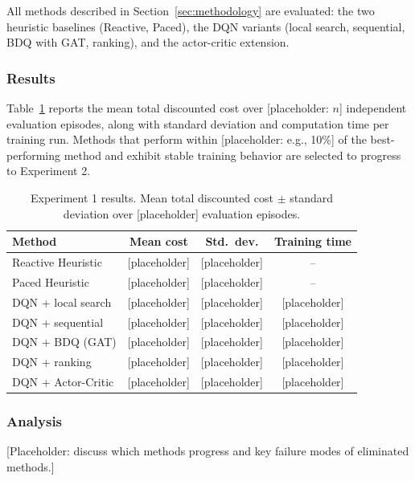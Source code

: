 \documentclass[3p, twocolumn]{elsarticle}
\begin{document}
All methods described in Section~\ref{sec:methodology} are evaluated: the two heuristic baselines (Reactive, Paced), the DQN variants (local search, sequential, BDQ with GAT, ranking), and the actor-critic extension.

\subsubsection{Results}

Table~\ref{tab:exp1_results} reports the mean total discounted cost over [placeholder: $n$] independent evaluation episodes, along with standard deviation and computation time per training run. Methods that perform within [placeholder: e.g., 10\%] of the best-performing method and exhibit stable training behavior are selected to progress to Experiment 2.

\begin{table}[htpb]
\centering
\caption{Experiment 1 results. Mean total discounted cost $\pm$ standard deviation over [placeholder] evaluation episodes.}
\label{tab:exp1_results}
\small
\begin{tabular}{lccc}
\hline
\textbf{Method} & \textbf{Mean cost} & \textbf{Std.\ dev.} & \textbf{Training time} \\
\hline
Reactive Heuristic      & [placeholder] & [placeholder] & -- \\
Paced Heuristic         & [placeholder] & [placeholder] & -- \\
DQN + local search      & [placeholder] & [placeholder] & [placeholder] \\
DQN + sequential        & [placeholder] & [placeholder] & [placeholder] \\
DQN + BDQ (GAT)         & [placeholder] & [placeholder] & [placeholder] \\
DQN + ranking           & [placeholder] & [placeholder] & [placeholder] \\
DQN + Actor-Critic      & [placeholder] & [placeholder] & [placeholder] \\
\hline
\end{tabular}
\end{table}

\subsubsection{Analysis}

[Placeholder: discuss which methods progress and key failure modes of eliminated methods.]
\end{document}
